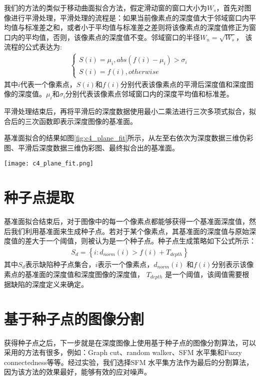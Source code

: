     我们的方法的类似于移动曲面拟合方法，假定滑动窗的窗口大小为$W_s$，首先对图像进行平滑处理，平滑处理的流程是：如果当前像素点的深度值大于邻域窗口内平均值与标准差之和，或者小于平均值与标准差之差则将该像素点的深度值修正为窗口内的平均值，否则，该像素点的深度值不变。邻域窗口的半径$W_n=\sqrt{W_s}$， 该流程的公式表达为:
    \begin{eqnarray}
    \left\{ \begin{array}{l}
    S\left( i \right) = {\mu _i},abs\left( {f\left( i \right) - {\mu _i}} \right) > {\sigma _i}\\
    S\left( i \right) = f\left( i \right),otherwise
    \end{array} \right.
    \end{eqnarray}
    其中$i$代表一个像素点，$S\left(i\right)$和$f\left(i\right)$分别代表该像素点的平滑后深度值和深度图像的深度值。$\mu_i$和$\sigma_i$分别代表该像素点邻域窗口内的深度平均值和标准差。

    平滑处理结束后，再将平滑后的深度数据使用最小二乘法进行三次多项式拟合，拟合后的三次函数即表示深度图像的基准面。

    基准面拟合的结果如图\ref{fig:c4_plane_fit}所示，从左至右依次为深度数据三维伪彩图、平滑后深度数据三维伪彩图、最终拟合出的基准面。

    \begin{figure*}[!h]
    \centering
    \texttt{[image: c4\_plane\_fit.png]}
    \caption{基准面拟合效果图}
    \label{fig:c4_plane_fit}
    \end{figure*}

    \section{种子点提取}
    基准面拟合结束后，对于图像中的每一个像素点都能够获得一个基准面深度值，然后我们利用基准面来生成种子点。若对于某个像素点，其基准面的深度值与原始深度值的差大于一个阈值，则被认为是一个种子点。种子点生成策略如下公式所示：
    \begin{eqnarray}
    S_d=\left\{i:d_{norm}\left(i\right)>f\left(i\right)+T_{depth}\right\}
    \end{eqnarray}
    其中$S_d$表示缺陷种子点集合，$i$表示一个像素点，$d_{norm}\left(i\right)$ 和$f\left(i\right)$分别表示该像素点的基准面的深度值和深度图像的深度值， $T_{depth}$ 是一个阈值，该阈值需要根据缺陷的深度定义来确定。
    \section{基于种子点的图像分割}
    获得种子点之后，下一步就是在深度图像上使用基于种子点的图像分割算法，可以采用的方法有很多，例如：Graph cut\cite{Boykov2001Interactive, Boykov2001Fast}、random walker\cite{Grady2006Random}、SFM 水平集\cite{Lankton2009Sparse}和Fuzzy connectedness\cite{Udupa2014Body, Udupa1996Disclaimer}等等。经过实验，我们选择SFM 水平集方法作为最后的分割算法，因为该方法的效果最好，能够有效的应对噪声。


